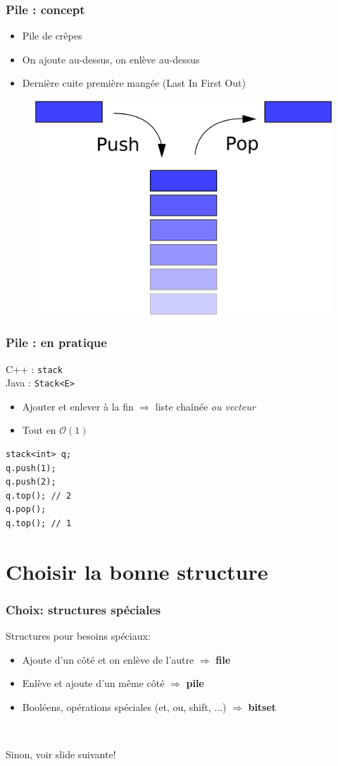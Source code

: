 \documentclass[12pt]{beamer}
\newcommand{\bigoh}[1]{\mathcal{O}\left(#1\right)}
\newcommand{\constant}{\bigoh{1}}
\begin{document}
\begin{frame}
\frametitle{Pile : concept}
\begin{itemize}
\item Pile de crêpes
\item On ajoute au-dessus, on enlève au-dessus
\item Dernière cuite première mangée (Last In First Out)
\end{itemize}
\begin{figure}
\centering
\includegraphics[width=.5\textwidth]{img/stack}
\end{figure}
\end{frame}

\begin{frame}[fragile]
\frametitle{Pile : en pratique}
C++ : \texttt{stack} \\
Java : \texttt{Stack<E>}
\begin{itemize}
\item Ajouter et enlever à la fin $\Rightarrow$ liste chaînée \emph{ou vecteur}
\item Tout en $\constant$
\end{itemize}
\begin{lstlisting}
stack<int> q;
q.push(1);
q.push(2);
q.top(); // 2
q.pop();
q.top(); // 1
\end{lstlisting}
\end{frame}

\section{Choisir la bonne structure}

\begin{frame}
\frametitle{Choix: structures spéciales}
Structures pour besoins spéciaux:
\begin{itemize}
\item Ajoute d'un côté et on enlève de l'autre $\Rightarrow$ \textbf{file}
\item Enlève et ajoute d'un même côté $\Rightarrow$ \textbf{pile}
\item Booléens, opérations spéciales (et, ou, shift, ...) $\Rightarrow$ \textbf{bitset}
\end{itemize}

~

Sinon, voir slide suivante!
\end{frame}
\end{document}
